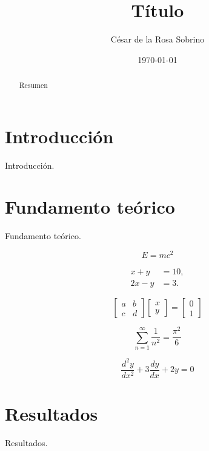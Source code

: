\documentclass[twocolumn, aps, prd, 10pt, nofootinbib]{revtex4-2}
\date{\today}
\makeatletter
\renewcommand{\date}[1]{\gdef\@date{\textnormal{Fecha: #1}}}
\makeatother
\begin{document}
\title{Título}
\author{César de la Rosa Sobrino}
\date{\today}

\begin{abstract}
	Resumen
\end{abstract}

\maketitle

\section{Introducción}
Introducción.
\section{Fundamento teórico}
Fundamento teórico.

\begin{equation}
	E = mc^2
\end{equation}
\cite{einstein1905}

\begin{align}
  x + y &= 10, \\
  2x - y &= 3.
\end{align}

\begin{equation}
  \begin{bmatrix}
    a & b \\
    c & d
  \end{bmatrix}
  \begin{bmatrix}
    x \\ y
  \end{bmatrix}
  =
  \begin{bmatrix}
    0 \\ 1
  \end{bmatrix}
\end{equation}

\begin{equation}
  \sum_{n=1}^{\infty} \frac{1}{n^2} = \frac{\pi^2}{6}
\end{equation}

\begin{equation}
  \frac{d^2y}{dx^2} + 3 \frac{dy}{dx} + 2y = 0
\end{equation}

\section{Resultados}
Resultados.
\end{document}
